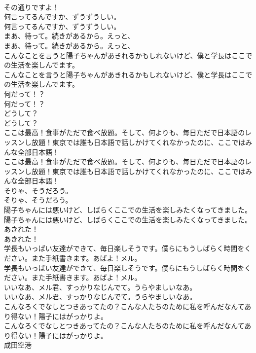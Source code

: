 \documentclass[8pt]{extreport}
\begin{document}
\begin{CJK}{UTF8}{min}
\\	その通りですよ！ 
\\	何言ってるんですか、ずうずうしい。	
\\	何言ってるんですか、ずうずうしい。 
\\	まあ、待って。続きがあるから。えっと、	
\\	まあ、待って。続きがあるから。えっと、 
\\	こんなことを言うと陽子ちゃんがあきれるかもしれないけど、僕と学長はここでの生活を楽しんでます。	
\\	こんなことを言うと陽子ちゃんがあきれるかもしれないけど、僕と学長はここでの生活を楽しんでます。 
\\	何だって！？	
\\	何だって！？ 
\\	どうして？	
\\	どうして？ 
\\	ここは最高！食事がただで食べ放題。そして、何よりも、毎日ただで日本語のレッスンし放題！東京では誰も日本語で話しかけてくれなかったのに、ここではみんな全部日本語！	
\\	ここは最高！食事がただで食べ放題。そして、何よりも、毎日ただで日本語のレッスンし放題！東京では誰も日本語で話しかけてくれなかったのに、ここではみんな全部日本語！ 
\\	そりゃ、そうだろう。	
\\	そりゃ、そうだろう。 
\\	陽子ちゃんには悪いけど、しばらくここでの生活を楽しみたくなってきました。	
\\	陽子ちゃんには悪いけど、しばらくここでの生活を楽しみたくなってきました。 
\\	あきれた！	
\\	あきれた！ 
\\	学長もいっぱい友達ができて、毎日楽しそうです。僕らにもうしばらく時間をください。また手紙書きます。あばよ！メル。	
\\	学長もいっぱい友達ができて、毎日楽しそうです。僕らにもうしばらく時間をください。また手紙書きます。あばよ！メル。 
\\	いいなあ、メル君、すっかりなじんでて。うらやましいなあ。	
\\	いいなあ、メル君、すっかりなじんでて。うらやましいなあ。 
\\	こんなろくでなしとつきあってたの？こんな人たちのために私を呼んだなんてあり得ない！陽子にはがっかりよ。	
\\	こんなろくでなしとつきあってたの？こんな人たちのために私を呼んだなんてあり得ない！陽子にはがっかりよ。 
\\	成田空港

\end{CJK}
\end{document}
